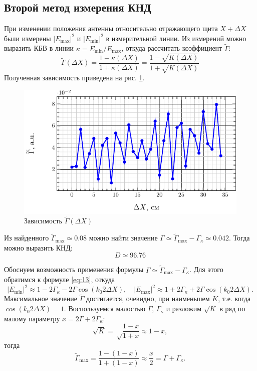 \documentclass[a4paper,14pt]{extarticle}
\begin{document}
\subsection{Второй метод измерения КНД}
При изменении положения антенны  относительно отражающего щита $X +\Delta X$ были измерены $|E_{\max}|^2$ и $|E_{\min}|^2$ в измерительной линии. Из измерений можно выразить КБВ в линии $\kappa = E_{\min} / E_{\max}$, откуда рассчитать коэффициент $\tilde{\Gamma}$:
\begin{equation}
    \tilde{\Gamma}(\Delta X)= \frac{1-\kappa (\Delta X)}{1+\kappa (\Delta X)} = \frac{1-\sqrt{K(\Delta X)}}{1+\sqrt{K(\Delta X)}} 
\end{equation}
Полученная зависимость приведена на рис. \ref{fig:exp:3}.
\begin{figure}[h!]
    \centering
    \includegraphics[scale=1.5]{fig/g_from_dx}
    \caption{Зависимость $\tilde{\Gamma}(\Delta X)$ }
    \label{fig:exp:3}
\end{figure}

Из найденного $\tilde{\Gamma}_{\max} \simeq 0.08$ можно найти значение $\Gamma \simeq \tilde{\Gamma}_{\max} -
\Gamma_{\kappa} \simeq 0.042$. Тогда можно выразить КНД: $$D \simeq 96.76$$ 

Обоснуем возможность применения формулы $\Gamma \simeq \tilde{\Gamma}_{\max} -
\Gamma_{\kappa}$. Для этого обратимся к формуле \eqref{eq:13}, откуда
\begin{equation}
    |E_{\min}|^{2} \approx 1-2 \Gamma_{\kappa}-2 \Gamma\cos \left(k_{0} 2 \Delta X\right), \quad
    |E_{\max}|^{2} \approx 1+2 \Gamma_{\kappa}+2 \Gamma\cos \left(k_{0} 2 \Delta X\right).
    \label{eq:eminmax}
\end{equation}
Максимальное значение $\tilde{\Gamma}$ достигается, очевидно, при наименьшем $K$, т.е. когда $\cos \left(k_{0} 2 \Delta X\right)=1$. Воспользуемся малостью $\Gamma$, $\Gamma_\kappa$ и разложим $\sqrt{K}$ в ряд по малому параметру $x=2\Gamma+2\Gamma_\kappa$:
\begin{equation}
  \sqrt{K}=\sqrt\frac{1-x}{1+x}\approx 1-x,
\end{equation}
тогда
\begin{equation}
  \tilde{\Gamma}_{\max}=\frac{1-(1-x)}{1+(1-x)}\approx \frac{x}{2} = \Gamma+\Gamma_\kappa.
\end{equation}
\end{document}

